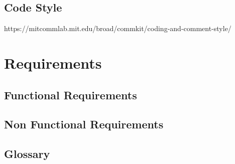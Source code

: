 \section{Code Style}
https://mitcommlab.mit.edu/broad/commkit/coding-and-comment-style/


\newpage




\chapter{Requirements}
\label{Requirements}

\section{Functional Requirements}
\section{Non Functional Requirements}

\begin{appendices}
\chapter{Glossary}


\end{appendices}


